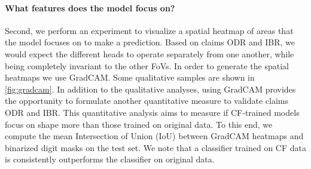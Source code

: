 \paragraph{What features does the model focus on?}
Second, we perform an experiment to visualize a spatial heatmap of areas that the model focuses on to make a prediction. Based on claims ODR and IBR, we would expect the different heads to operate separately from one another, while being completely invariant to the other FoVs.
In order to generate the spatial heatmaps we use GradCAM.
Some qualitative samples are shown in \cref{fig:gradcam}.
In addition to the qualitative analyses, using GradCAM provides the opportunity to formulate another quantitative measure to validate claims ODR and IBR. This quantitative analysis aims to measure if CF-trained models focus on shape more than those trained on original data. To this end, we compute the mean Intersection of Union (IoU) between GradCAM heatmaps and binarized digit masks on the test set.
We note that a classifier trained on CF data is consistently outperforms the classifier on original data.

